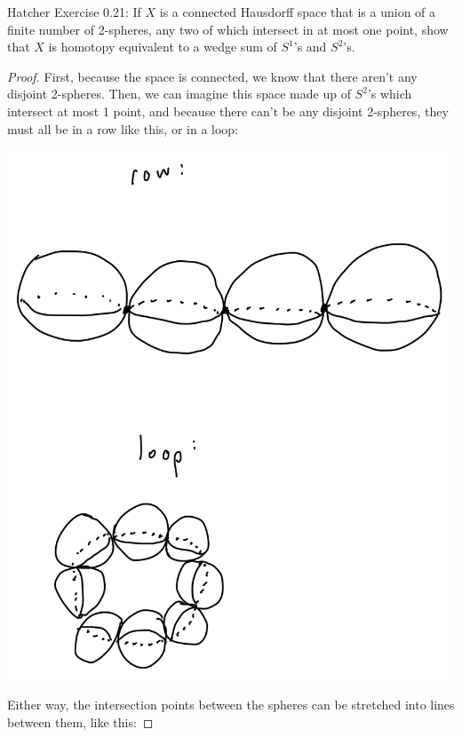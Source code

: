 \documentclass[12pt]{article}
\newenvironment{statement}[2][Statement]{\begin{trivlist}
\item[\hskip \labelsep {\bfseries #1}\hskip \labelsep {\bfseries #2.}]}{\end{trivlist}}
\begin{document}
\begin{statement}[Exercise]{3}
    Hatcher Exercise 0.21: If $X$ is a connected Hausdorff space that is a union of a finite number of 2-spheres, any two of which intersect in at most one point, show that $X$ is homotopy equivalent to a wedge sum of $S^1$'s and $S^2$'s.
\end{statement}
\begin{proof}
    First, because the space is connected, we know that there aren't any disjoint 2-spheres. Then, we can imagine this space made up of $S^2$'s which intersect at most 1 point, and because there can't be any disjoint 2-spheres, they must all be in a row like this, or in a loop:
    \par \includegraphics[scale=.2]{2.3.1.png}
    \par Either way, the intersection points between the spheres can be stretched into lines between them, like this:

\end{proof}
\end{document}
